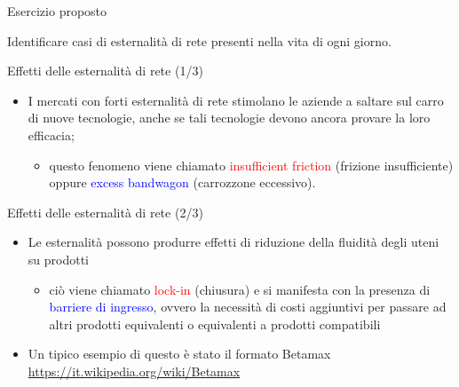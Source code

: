 \documentclass{beamer}
\begin{document}
\begin{frame}
{\centerline{Esercizio proposto}}
\vspace{1cm}
\begin{center}
    \LARGE{Identificare casi di esternalit\`{a} di rete presenti nella vita di ogni giorno.}
\end{center}

\end{frame}


\begin{frame}
{\centerline{Effetti delle esternalit\`{a} di rete (1/3)}}

\begin{itemize}
\item I mercati con forti esternalit\`{a} di rete stimolano le aziende a saltare sul carro di nuove tecnologie, anche se tali tecnologie devono ancora provare la loro efficacia;
\begin{itemize}
\item questo fenomeno viene chiamato \textcolor{red}{insufficient friction} (frizione insufficiente) oppure \textcolor{blue}{excess bandwagon} (carrozzone eccessivo).
\end{itemize}

\end{itemize}

\end{frame}

\begin{frame}
{\centerline{Effetti delle esternalit\`{a} di rete (2/3)}}

\begin{itemize}
\item Le esternalit\`{a} possono produrre effetti di riduzione della fluidit\`{a} degli uteni su prodotti
\begin{itemize}
\item ci\`{o} viene chiamato \textcolor{red}{lock-in} (chiusura) e si manifesta con la presenza di \textcolor{blue}{barriere di ingresso}, ovvero la necessit\`{a} di costi aggiuntivi per passare ad altri prodotti equivalenti o equivalenti a prodotti compatibili
\end{itemize}
\item Un tipico esempio di questo è stato il formato Betamax \url{https://it.wikipedia.org/wiki/Betamax}

\end{itemize}

\end{frame}
\end{document}
